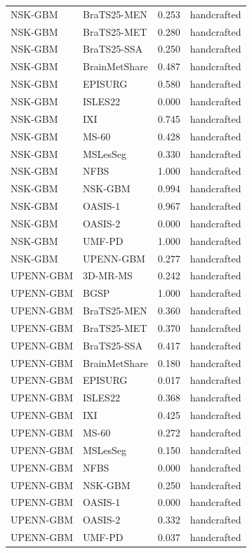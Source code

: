 \begin{tabular}{llrl}
NSK-GBM & BraTS25-MEN & 0.253 & handcrafted \\
NSK-GBM & BraTS25-MET & 0.280 & handcrafted \\
NSK-GBM & BraTS25-SSA & 0.250 & handcrafted \\
NSK-GBM & BrainMetShare & 0.487 & handcrafted \\
NSK-GBM & EPISURG & 0.580 & handcrafted \\
NSK-GBM & ISLES22 & 0.000 & handcrafted \\
NSK-GBM & IXI & 0.745 & handcrafted \\
NSK-GBM & MS-60 & 0.428 & handcrafted \\
NSK-GBM & MSLesSeg & 0.330 & handcrafted \\
NSK-GBM & NFBS & 1.000 & handcrafted \\
NSK-GBM & NSK-GBM & 0.994 & handcrafted \\
NSK-GBM & OASIS-1 & 0.967 & handcrafted \\
NSK-GBM & OASIS-2 & 0.000 & handcrafted \\
NSK-GBM & UMF-PD & 1.000 & handcrafted \\
NSK-GBM & UPENN-GBM & 0.277 & handcrafted \\
UPENN-GBM & 3D-MR-MS & 0.242 & handcrafted \\
UPENN-GBM & BGSP & 1.000 & handcrafted \\
UPENN-GBM & BraTS25-MEN & 0.360 & handcrafted \\
UPENN-GBM & BraTS25-MET & 0.370 & handcrafted \\
UPENN-GBM & BraTS25-SSA & 0.417 & handcrafted \\
UPENN-GBM & BrainMetShare & 0.180 & handcrafted \\
UPENN-GBM & EPISURG & 0.017 & handcrafted \\
UPENN-GBM & ISLES22 & 0.368 & handcrafted \\
UPENN-GBM & IXI & 0.425 & handcrafted \\
UPENN-GBM & MS-60 & 0.272 & handcrafted \\
UPENN-GBM & MSLesSeg & 0.150 & handcrafted \\
UPENN-GBM & NFBS & 0.000 & handcrafted \\
UPENN-GBM & NSK-GBM & 0.250 & handcrafted \\
UPENN-GBM & OASIS-1 & 0.000 & handcrafted \\
UPENN-GBM & OASIS-2 & 0.332 & handcrafted \\
UPENN-GBM & UMF-PD & 0.037 & handcrafted \\

\end{tabular}
